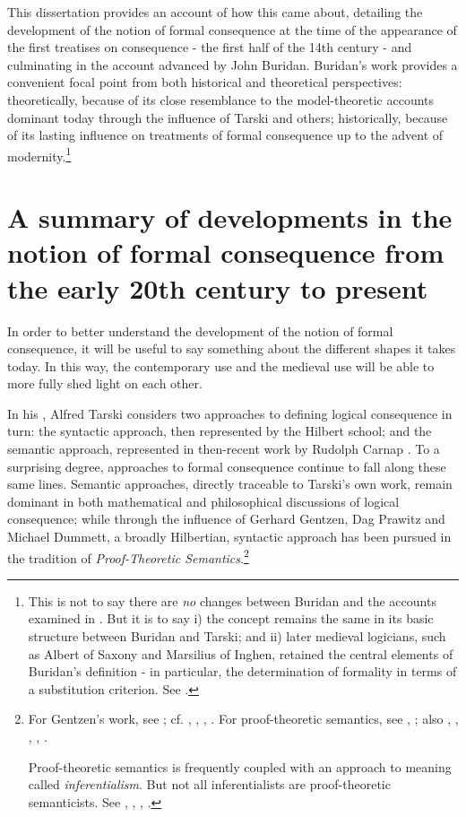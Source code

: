 \documentclass[]{article}
\begin{document}
This dissertation provides an account of how this came about, detailing the development of the notion of formal consequence at the time of the appearance of the first treatises on consequence - the first half of the 14th century - and culminating in the account advanced by John Buridan. Buridan's work provides a convenient focal point from both historical and theoretical perspectives: theoretically, because of its close resemblance to the model-theoretic accounts dominant today through the influence of Tarski and others; historically, because of its lasting influence on treatments of formal consequence up to the advent of modernity.\footnote{This is not to say there are \textit{no} changes between Buridan and the accounts examined in \cite{Tarski2002}. But it is to say i) the concept remains the same in its basic structure between Buridan and Tarski; and ii) later medieval logicians, such as Albert of Saxony and Marsilius of Inghen, retained the central elements of Buridan's definition - in particular, the determination of formality in terms of a substitution criterion. See \cite{DutilhNovaes2012a}.}

\section{A summary of developments in the notion of formal consequence from the early 20th century to present}
In order to better understand the development of the notion of formal consequence, it will be useful to say something about the different shapes it takes today. In this way, the contemporary use and the medieval use will be able to more fully shed light on each other.

In his \cite{Tarski2002}, Alfred Tarski considers two approaches to defining logical consequence in turn: the syntactic approach, then represented by the Hilbert school; and the semantic approach, represented in then-recent work by Rudolph Carnap \cite{Carnap1934}. To a surprising degree, approaches to formal consequence continue to fall along these same lines. Semantic approaches, directly traceable to Tarski's own work, remain dominant in both mathematical and philosophical discussions of logical consequence; while through the influence of Gerhard Gentzen, Dag Prawitz and Michael Dummett, a broadly Hilbertian, syntactic approach has been pursued in the tradition of \textit{Proof-Theoretic Semantics}.\footnote{For Gentzen's work, see \cite{Gentzen1934}; cf. \cite{Franks2010}, \cite{Hazen2014}, \cite{Moriconi2015}, \cite{vonPlato2014}. For proof-theoretic semantics, see \cite{Prawitz1974}, \cite{Prawitz1985}; also \cite{Jacinto2017}, \cite{Francez2014a}, \cite{Francez2016a}, \cite{Francez2016b}, \cite{Schroeder-Heister2006}.

Proof-theoretic semantics is frequently coupled with an approach to meaning called \textit{inferentialism}. But not all inferentialists are proof-theoretic semanticists. See \cite{Belnap1990}, \cite{Garson2001}, \cite{Garson2013}, \cite{Hjortland2009}.}
\end{document}
